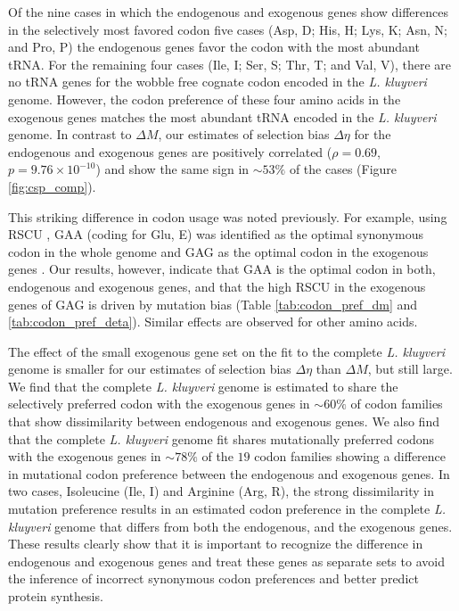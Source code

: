 \documentclass[doublespacing,linenumbers]{bmcart-modified}
\newcommand{\kluyveri}{\textit{L. kluyveri}\xspace}
\newcommand{\DM}{\ensuremath{{\Delta M}}\xspace}
\newcommand{\DE}{\ensuremath{{\Delta \eta}}\xspace}
\begin{document}
Of the nine cases in which the endogenous and exogenous genes show differences in the selectively most favored codon five cases (Asp, D; His, H; Lys, K; Asn, N; and Pro, P) the endogenous genes favor the codon with the most abundant tRNA.
For the remaining four cases (Ile, I; Ser, S; Thr, T; and Val, V), there are no tRNA genes for the wobble free cognate codon encoded in the \kluyveri genome.
However, the codon preference of these four amino acids in the exogenous genes matches the most abundant tRNA encoded in the \kluyveri genome.
In contrast to \DM, our estimates of selection bias \DE for the endogenous and exogenous genes are positively correlated ($\rho = 0.69$, $p = 9.76\times10^{-10}$) and show the same sign in $\sim53\%$ of the cases (Figure \ref{fig:csp_comp}).

This striking difference in codon usage was noted previously.
For example, using RSCU \citep{sharp1987}, GAA (coding for Glu, E) was identified as the optimal synonymous codon in the whole genome and GAG as the optimal codon in the exogenous genes  \cite{payen2009}.
Our results, however, indicate that GAA is the optimal codon in both, endogenous and exogenous genes, and that the high RSCU in the exogenous genes of GAG is driven by mutation bias (Table \ref{tab:codon_pref_dm} and \ref{tab:codon_pref_deta}).
Similar effects are observed for other amino acids.

The effect of the small exogenous gene set on the fit to the complete \kluyveri genome is smaller for our estimates of selection bias \DE than \DM, but still large.
We find that the complete \kluyveri genome is estimated to share the selectively preferred codon with the exogenous genes in $\sim60\%$ of codon families that show dissimilarity between endogenous and exogenous genes.
We also find that the complete \kluyveri genome fit shares mutationally preferred codons with the exogenous genes in $\sim78\%$ of the $19$ codon families showing a difference in mutational codon preference between the endogenous and exogenous genes.
In two cases, Isoleucine (Ile, I) and Arginine (Arg, R), the strong dissimilarity in mutation preference results in an estimated codon preference in the complete \kluyveri genome that differs from both the endogenous, and the exogenous genes.
These results clearly show that it is important to recognize the difference in endogenous and exogenous genes and treat these genes as separate sets to avoid the inference of incorrect synonymous codon preferences and better predict protein synthesis.

\end{document}
